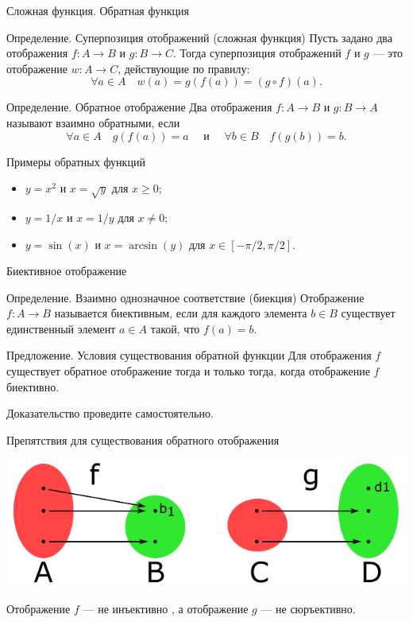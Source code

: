\documentclass[8pt]{beamer}
\begin{document}
\begin{frame}{Сложная функция. Обратная функция}
\begin{block}{Определение. Суперпозиция отображений (сложная функция)}
Пусть задано два отображения  $f: A \rightarrow B$ и  $g: B \rightarrow C$. Тогда суперпозиция отображений  $f$ и $g$ --- это отображение $w: A \rightarrow C$, действующие по правилу:
$$\forall a \in A \quad w(a) = g(f(a))=(g\circ f)(a).$$
\end{block}
\pause
\begin{block}{Определение. Обратное отображение}
Два отображения  $f: A \rightarrow B$ и  $g: B \rightarrow A$ называют взаимно обратными, если
$$\forall a \in A \quad  g(f(a))=a 
\quad\text{ и }\quad 
\forall b \in B \quad  f(g(b))=b.$$
\end{block}
\pause
\begin{block}{Примеры обратных функций}
\begin{itemize}
\item $y=x^2$ и $x=\sqrt{y}$ для $x\ge 0$;
\item $y=1/x$ и $x=1/y$ для $x\ne 0$;
\item $y=\sin(x)$ и $x=\arcsin(y)$ для $x\in [-\pi/2, \pi/2 ]$.
\end{itemize}
\end{block}
\end{frame}

\begin{frame}{Биективное отображение}
\begin{block}{Определение. Взаимно однозначное соответствие (биекция)}
Отображение  $f: A \rightarrow B$ называется биективным, если для каждого элемента $b\in B$ существует единственный элемент $a\in A$ такой, что $f(a)=b$.
\end{block}

\begin{block}{Предложение. Условия существования обратной функции}
Для отображения $f$ существует обратное отображение тогда и только тогда, когда отображение $f$ биективно.
\end{block}
Доказательство проведите самостоятельно.

\begin{block}{Препятствия для существования обратного отображения}

\begin{center}
\includegraphics[scale=0.7]{set1.pdf}
\end{center}
Отображение $f$ --- не инъективно , а отображение $g$ --- не сюръективно.
\end{block}
\end{frame}
\end{document}
